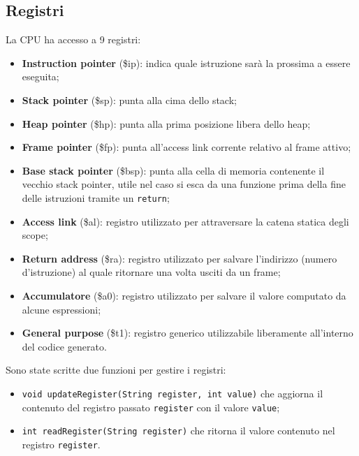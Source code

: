 \documentclass[../report.tex]{subfiles}
\begin{document}
\subsection{Registri}\label{ss:registri}
La CPU ha accesso a 9 registri:
\begin{itemize}
    \item \textbf{Instruction pointer} (\$ip): indica quale istruzione sar\`a la prossima a essere eseguita;
    \item \textbf{Stack pointer} (\$sp): punta alla cima dello stack;
    \item \textbf{Heap pointer} (\$hp): punta alla prima posizione libera dello heap;
    \item \textbf{Frame pointer} (\$fp): punta all'access link corrente relativo al frame attivo;
    \item \textbf{Base stack pointer} (\$bsp): punta alla cella di memoria contenente il vecchio stack pointer, utile nel caso si esca da una funzione prima della fine delle istruzioni tramite un \verb|return|;
    \item \textbf{Access link} (\$al): registro utilizzato per attraversare la catena statica degli scope;
    \item \textbf{Return address} (\$ra): registro utilizzato per salvare l'indirizzo (numero d'istruzione) al quale ritornare una volta usciti da un frame;
    \item \textbf{Accumulatore} (\$a0): registro utilizzato per salvare il valore computato da alcune espressioni;
    \item \textbf{General purpose} (\$t1): registro generico utilizzabile liberamente all'interno del codice generato.
\end{itemize}
Sono state scritte due funzioni per gestire i registri:
\begin{itemize}
    \item \verb|void updateRegister(String register, int value)| che aggiorna il contenuto del registro passato \verb|register| con il valore \verb|value|;
    \item \verb|int readRegister(String register)| che ritorna il valore contenuto nel registro \verb|register|.
\end{itemize}
\end{document}
